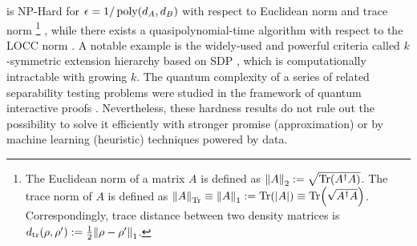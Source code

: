 \documentclass[
aps,
pra,
twocolumn,
floatfix,
]{revtex4-2}
\theoremstyle{plain}
\newtheorem{theorem}{Theorem}
\theoremstyle{definition}
\newcommand{\dm}{\rho}
\newcommand{\locc}{\textup{LOCC}}
\begin{document}
 is NP-Hard for $\epsilon=1/\operatorname{\textup{poly}}(d_A,d_B)$ with respect to Euclidean norm and trace norm \footnote{
	The Euclidean norm of a matrix $A$ is defined as $\norm{A}_2:=\sqrt{\Tr(A^\dagger A)}$.
	The trace norm of $A$ is defined as $\norm{A}_{\Tr}\equiv\norm{A}_{1}:=\Tr(\abs{A})\equiv\Tr(\sqrt{A^\dagger A})$.
	Correspondingly, trace distance between two density matrices is $d_{\tr}(\dm,\dm') : = \frac{1}{2} \norm{\dm-\dm'}_1$.
} \cite{gurvitsClassicalDeterministicComplexity2003} \cite{gharibianStrongNPHardnessQuantum2009},
while there exists a quasipolynomial-time algorithm with respect to the LOCC norm \cite{brandaoQuasipolynomialtimeAlgorithmQuantum2011}.
A notable example is the widely-used and powerful criteria called $k$-symmetric extension hierarchy based on SDP \cite{dohertyCompleteFamilySeparability2004} \cite{ioannouComputationalComplexityQuantum2007} \cite{navascuesPowerSymmetricExtensions2009}, 
which is computationally intractable with growing $k$.
The quantum complexity of a series of related separability testing problems were studied in the framework of quantum interactive proofs \cite{gutoskiQuantumInteractiveProofs2015}.
Nevertheless, these hardness results do not rule out the possibility to solve it efficiently with stronger promise (approximation) or by machine learning (heuristic) techniques powered by data.
\end{document}
